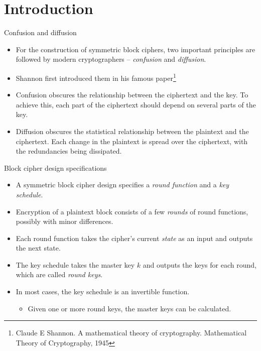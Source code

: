 \section{Introduction}
\begin{frame}{\VideoName}
    \tableofcontents[currentsection]
\end{frame}

\begin{frame}{Confusion and diffusion}
    \begin{itemize}
        \item For the construction of symmetric block ciphers, two important principles are followed by modern cryptographers -- \textit{confusion} and \textit{diffusion}.
        \item Shannon first introduced them in his famous paper\footnote{Claude E Shannon. A mathematical theory of cryptography. Mathematical Theory of Cryptography, 1945}
        \item Confusion obscures the relationship between the ciphertext and the key.
        To achieve this, each part of the ciphertext should depend on several parts of the key.
       \item Diffusion obscures the statistical relationship between the plaintext and the ciphertext.
       Each change in the plaintext is spread over the ciphertext, with the redundancies being dissipated.
    \end{itemize}
\end{frame}

\begin{frame}{Block cipher design specifications}
    \begin{itemize}
        \item A symmetric block cipher design specifies a \textit{round function} and a \textit{key schedule}.
        \item Encryption of a plaintext block consists of a few \textit{rounds} of round functions, possibly with minor differences.
       \item Each round function takes the cipher's current \textit{state} as an input and outputs the next state.
       \item The key schedule takes the master key $k$ and outputs the keys for each round, which are called \textit{round keys}.
       \item In most cases, the key schedule is an invertible function.
       \begin{itemize}
           \item Given one or more round keys, the master keys can be calculated.
       \end{itemize}
    \end{itemize}
\end{frame}

